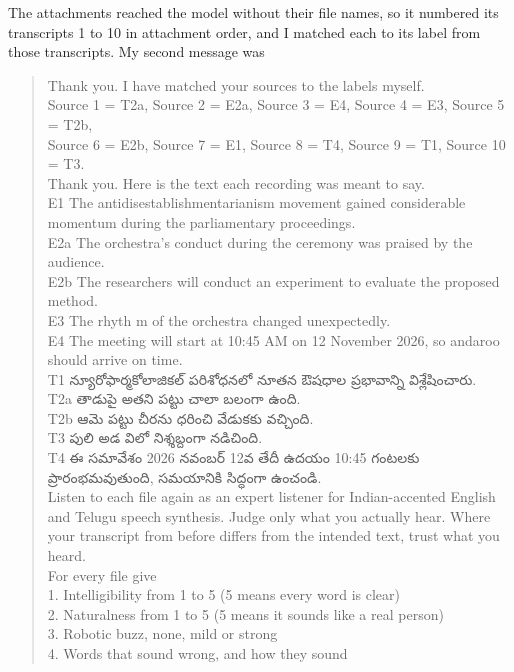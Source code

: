 \documentclass[11pt,a4paper]{article}
\newcommand{\te}[1]{{\telugufont #1}}
\begin{document}
The attachments reached the model without their file names, so it numbered its transcripts 1 to 10 in
attachment order, and I matched each to its label from those transcripts. My second message was
\begin{quote}\footnotesize\raggedright
Thank you. I have matched your sources to the labels myself.\\
Source 1 = T2a, Source 2 = E2a, Source 3 = E4, Source 4 = E3, Source 5 = T2b,\\
Source 6 = E2b, Source 7 = E1, Source 8 = T4, Source 9 = T1, Source 10 = T3.\\
Thank you. Here is the text each recording was meant to say.\\
\medskip
E1  The antidisestablishmentarianism movement gained considerable momentum during the parliamentary proceedings.\\
E2a The orchestra's conduct during the ceremony was praised by the audience.\\
E2b The researchers will conduct an experiment to evaluate the proposed method.\\
E3  The rhyth m of the orchestra changed unexpectedly.\\
E4  The meeting will start at 10:45 AM on 12 November 2026, so andaroo should arrive on time.\\
T1  \te{న్యూరోఫార్మకోలాజికల్ పరిశోధనలో నూతన ఔషధాల ప్రభావాన్ని విశ్లేషించారు}.\\
T2a \te{తాడుపై అతని పట్టు చాలా బలంగా ఉంది}.\\
T2b \te{ఆమె పట్టు చీరను ధరించి వేడుకకు వచ్చింది}.\\
T3  \te{పులి అడ విలో నిశ్శబ్దంగా నడిచింది}.\\
T4  \te{ఈ సమావేశం} 2026 \te{నవంబర్} 12\te{వ తేదీ ఉదయం} 10:45 \te{గంటలకు ప్రారంభమవుతుంది}, \te{సమయానికి సిద్ధంగా ఉంచండి}.\\
\medskip
Listen to each file again as an expert listener for Indian-accented English and Telugu speech synthesis. Judge only what you actually hear. Where your transcript from before differs from the intended text, trust what you heard.\\
\medskip
For every file give\\
1. Intelligibility from 1 to 5 (5 means every word is clear)\\
2. Naturalness from 1 to 5 (5 means it sounds like a real person)\\
3. Robotic buzz, none, mild or strong\\
4. Words that sound wrong, and how they sound\\

\end{quote}
\end{document}

